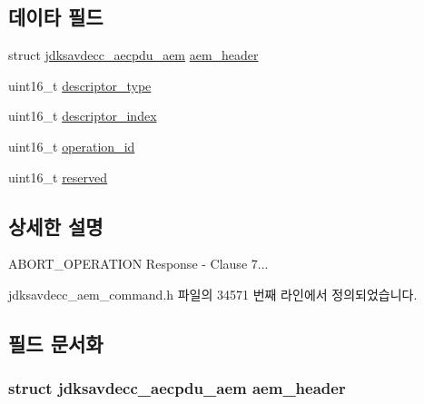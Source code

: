 \subsection*{데이타 필드}
\begin{DoxyCompactItemize}
\item 
struct \hyperlink{structjdksavdecc__aecpdu__aem}{jdksavdecc\+\_\+aecpdu\+\_\+aem} \hyperlink{structjdksavdecc__aem__command__abort__operation__response_ae1e77ccb75ff5021ad923221eab38294}{aem\+\_\+header}
\item 
uint16\+\_\+t \hyperlink{structjdksavdecc__aem__command__abort__operation__response_ab7c32b6c7131c13d4ea3b7ee2f09b78d}{descriptor\+\_\+type}
\item 
uint16\+\_\+t \hyperlink{structjdksavdecc__aem__command__abort__operation__response_a042bbc76d835b82d27c1932431ee38d4}{descriptor\+\_\+index}
\item 
uint16\+\_\+t \hyperlink{structjdksavdecc__aem__command__abort__operation__response_a5b1b19c38a3b340cfc6ebcb9eeb153e2}{operation\+\_\+id}
\item 
uint16\+\_\+t \hyperlink{structjdksavdecc__aem__command__abort__operation__response_a5a6ed8c04a3db86066924b1a1bf4dad3}{reserved}
\end{DoxyCompactItemize}


\subsection{상세한 설명}
A\+B\+O\+R\+T\+\_\+\+O\+P\+E\+R\+A\+T\+I\+ON Response -\/ Clause 7... 

jdksavdecc\+\_\+aem\+\_\+command.\+h 파일의 34571 번째 라인에서 정의되었습니다.



\subsection{필드 문서화}
\subsubsection[{\texorpdfstring{aem\+\_\+header}{aem_header}}]{\setlength{\rightskip}{0pt plus 5cm}struct {\bf jdksavdecc\+\_\+aecpdu\+\_\+aem} aem\+\_\+header}\hypertarget{structjdksavdecc__aem__command__abort__operation__response_ae1e77ccb75ff5021ad923221eab38294}{}\label{structjdksavdecc__aem__command__abort__operation__response_ae1e77ccb75ff5021ad923221eab38294}



